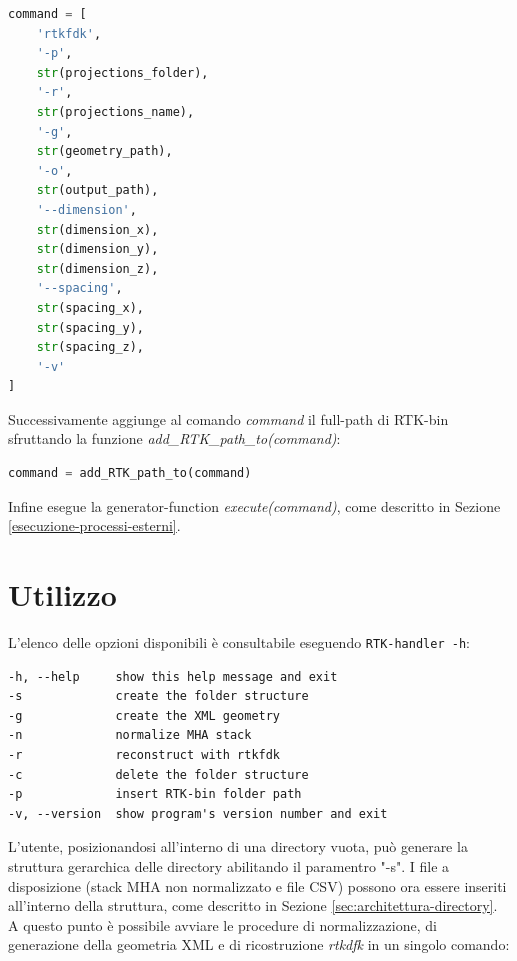 \documentclass[a4paper,12pt, doubleside]{report}
\begin{document}
\begin{itemize}
                    \begin{lstlisting}[language=python, frame=bt]
command = [
    'rtkfdk',
    '-p',
    str(projections_folder),
    '-r',
    str(projections_name),
    '-g',
    str(geometry_path),
    '-o',
    str(output_path),
    '--dimension',
    str(dimension_x),
    str(dimension_y),
    str(dimension_z),
    '--spacing',
    str(spacing_x),
    str(spacing_y),
    str(spacing_z),
    '-v'
]
                    \end{lstlisting}
                        
                    Successivamente aggiunge al comando \textit{command} il full-path di RTK-bin sfruttando la funzione \textit{add\_RTK\_path\_to(command)}:
                        
                    \begin{lstlisting}[language=python, frame=bt]
command = add_RTK_path_to(command)
                        \end{lstlisting}
                        
                    Infine esegue la generator-function \textit{execute(command)}, come descritto in Sezione \ref{esecuzione-processi-esterni}.
                        
                \end{itemize}                    
        
        \section{Utilizzo}
        \label{sec:utilizzo}
        
            \par
                L'elenco delle opzioni disponibili è consultabile eseguendo \texttt{RTK-handler -h}:
                
                \bigskip
                \begin{lstlisting}[frame=bt]
-h, --help     show this help message and exit
-s             create the folder structure
-g             create the XML geometry
-n             normalize MHA stack
-r             reconstruct with rtkfdk
-c             delete the folder structure
-p             insert RTK-bin folder path
-v, --version  show program's version number and exit
                \end{lstlisting}
            
            \bigskip
            \par
                L'utente, posizionandosi all'interno di una directory vuota, può generare la struttura gerarchica delle directory abilitando il paramentro "-s". I file a disposizione (stack MHA non normalizzato e file CSV) possono ora essere inseriti all'interno della struttura, come descritto in Sezione \ref{sec:architettura-directory}. A questo punto è possibile avviare le procedure di normalizzazione, di generazione della geometria XML e di ricostruzione \textit{rtkdfk} in un singolo comando:
                
\end{document}
